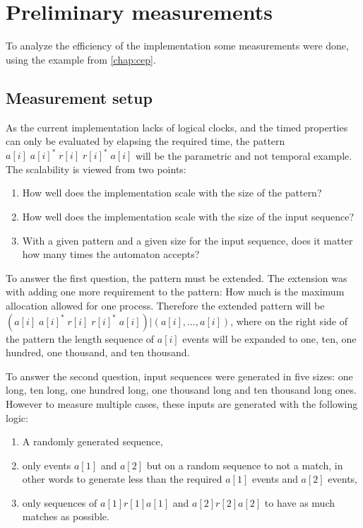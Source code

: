 	\section{Preliminary measurements}
	To analyze the efficiency of the implementation some measurements were done, using the example from \cref{chap:cep}.
	
	\subsection{Measurement setup}
	As the current implementation lacks of logical clocks, and the timed properties can only be evaluated by elapsing the required time, the pattern $a[i] \; a[i]^\ast \; r[i] \; r[i]^\ast \; a[i]$ will be the parametric and not temporal example.
	The scalability is viewed from two points:
	
	\begin{enumerate}
		\item How well does the implementation scale with the size of the pattern?
		\item How well does the implementation scale with the size of the input sequence?
		\item With a given pattern and a given size for the input sequence, does it matter how many times the automaton accepts?
	\end{enumerate}
	
	To answer the first question, the pattern must be extended. The extension was with adding one more requirement to the pattern: How much is the maximum allocation allowed for one process. Therefore the extended pattern will be $ ( a[i] \; a[i]^\ast \; r[i] \; r[i]^\ast \; a[i] ) | (a[i],\dots,a[i])$, where on the right side of the pattern the length sequence of $a[i]$ events will be expanded to one, ten, one hundred, one thousand, and ten thousand.
	
	To answer the second question, input sequences were generated in five sizes: one long, ten long, one hundred long, one thousand long and ten thousand long ones.
	However to measure multiple cases, these inputs are generated with the following logic:
	\begin{enumerate}
		\item A randomly generated sequence,
		\item only events $a[1]$ and $a[2]$ but on a random sequence to not a match, in other words to generate less than the required $a[1]$ events and $a[2]$ events,
		\item only sequences of $a[1] r[1] a[1]$ and $a[2] r[2] a[2]$ to have as much matches as possible.
	\end{enumerate}

